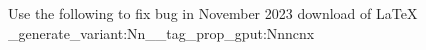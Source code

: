 Use the following to fix bug in November 2023 download of LaTeX
\ExplSyntaxOn
\cs_generate_variant:Nn\__tag_prop_gput:Nnn{cnx}
\ExplSyntaxOff
